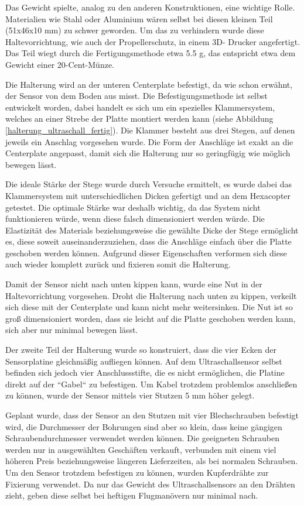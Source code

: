	Das Gewicht spielte, analog zu den anderen Konstruktionen, eine wichtige Rolle.
	Materialien wie Stahl oder Aluminium wären selbst bei diesen kleinen Teil (51x46x10 mm) zu schwer geworden.
	Um das zu verhindern wurde diese Haltevorrichtung, wie auch der Propellerschutz, in einem 3D- Drucker angefertigt.
	Das Teil wiegt durch die Fertigungsmethode etwa 5.5 g, das entspricht etwa dem Gewicht einer 20-Cent-Münze.

			\newpage

	Die Halterung wird an der unteren Centerplate befestigt, da wie schon erwähnt, der Sensor von dem Boden aus misst.
	Die Befestigungsmethode ist selbst entwickelt worden, dabei handelt es sich um ein spezielles Klammersystem, welches an einer Strebe der Platte montiert werden kann (siehe Abbildung \ref{halterung_ultraschall_fertig}).
	Die Klammer besteht aus drei Stegen, auf denen jeweils ein Anschlag vorgesehen wurde.
	Die Form der Anschläge ist  exakt an die Centerplate angepasst, damit sich die Halterung nur so geringfügig wie möglich bewegen lässt.

	Die ideale Stärke der Stege wurde durch Versuche ermittelt, es wurde dabei das Klammersystem mit unterschiedlichen Dicken gefertigt und an dem Hexacopter getestet.
	Die optimale Stärke war deshalb wichtig, da das System nicht funktionieren würde, wenn diese falsch dimensioniert werden würde.
	Die Elastizität des Materials beziehungsweise die gewählte Dicke der Stege ermöglicht es, diese soweit auseinanderzuziehen, dass die Anschläge einfach über die Platte geschoben werden können.
	Aufgrund dieser Eigenschaften verformen sich diese auch wieder komplett zurück und fixieren somit die Halterung.

	Damit der Sensor nicht nach unten kippen kann, wurde eine Nut in der Haltevorrichtung vorgesehen.
	Droht die Halterung nach unten zu kippen, verkeilt sich diese mit der Centerplate und kann nicht mehr weitersinken.
	Die Nut ist so groß dimensioniert worden, dass sie leicht auf die Platte geschoben werden kann, sich aber nur minimal bewegen lässt.

	Der zweite Teil der Halterung wurde so konstruiert, dass die vier Ecken der Sensorplatine gleichmäßig aufliegen können.
	Auf dem Ultraschallsensor selbst befinden sich jedoch vier Anschlussstifte, die es nicht ermöglichen, die Platine direkt auf der “Gabel“ zu befestigen.
	Um Kabel trotzdem problemlos anschließen zu können, wurde der Sensor mittels vier Stutzen 5 mm höher gelegt.

	Geplant wurde, dass der Sensor an den Stutzen mit vier Blechschrauben befestigt wird, die Durchmesser der Bohrungen sind aber so klein, dass keine gängigen Schraubendurchmesser verwendet werden können.
	Die geeigneten Schrauben werden nur in ausgewählten Geschäften verkauft, verbunden mit einem viel höheren Preis beziehungsweise längeren Lieferzeiten, als bei normalen Schrauben.
	Um den Sensor trotzdem befestigen zu können, wurden Kupferdrähte zur Fixierung verwendet.
	Da nur das Gewicht des Ultraschallsensors an den Drähten zieht, geben diese selbst bei heftigen Flugmanövern nur minimal nach.

